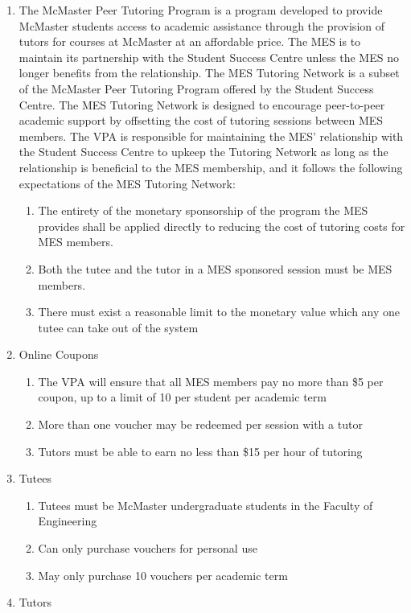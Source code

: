 \begin{enumerate}
 \item
  The McMaster Peer Tutoring Program is a program developed to provide McMaster students access to academic assistance through the provision of tutors for courses at McMaster at an affordable price. The MES is to maintain its partnership with the Student Success Centre unless the MES no longer benefits from the relationship. The MES Tutoring Network is a subset of the McMaster Peer Tutoring Program offered by the Student Success Centre. The MES Tutoring Network is designed to encourage peer-to-peer academic support by offsetting the cost of tutoring sessions between MES members. The VPA is responsible for maintaining the MES' relationship with the Student Success Centre to upkeep the Tutoring Network as long as the relationship is beneficial to the MES membership, and it follows the following expectations of the MES Tutoring Network:

  \begin{enumerate}
   \item
    The entirety of the monetary sponsorship of the program the MES provides shall be applied directly to reducing the cost of tutoring costs for MES members.
   \item
    Both the tutee and the tutor in a MES sponsored session must be MES members.
   \item
    There must exist a reasonable limit to the monetary value which any one tutee can take out of the system
  \end{enumerate}
 \item
  Online Coupons

  \begin{enumerate}
   \item
    The VPA will ensure that all MES members pay no more than \$5 per coupon, up to a limit of 10 per student per academic term
   \item
    More than one voucher may be redeemed per session with a tutor
   \item
    Tutors must be able to earn no less than \$15 per hour of tutoring
  \end{enumerate}
 \item
  Tutees

  \begin{enumerate}
   \item
    Tutees must be McMaster undergraduate students in the Faculty of Engineering
   \item
    Can only purchase vouchers for personal use
   \item
    May only purchase 10 vouchers per academic term
  \end{enumerate}
 \item
  Tutors


\end{enumerate}

